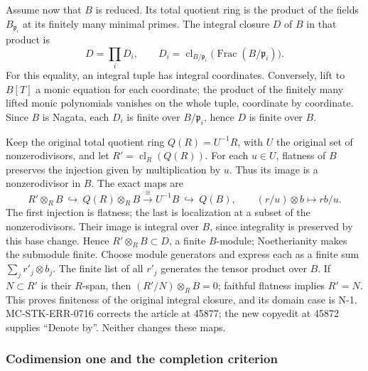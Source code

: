 Assume now that \(B\) is reduced. Its total quotient ring is the product of the fields \(B_{\mathfrak p_i}\) at its finitely many minimal primes. The integral closure \(D\) of \(B\) in that product is \[
 D=\prod_i D_i,\qquad
 D_i=\operatorname{cl}_{B/\mathfrak p_i}\bigl(\operatorname{Frac}(B/\mathfrak p_i)\bigr).
\] For this equality, an integral tuple has integral coordinates. Conversely, lift to \(B[T]\) a monic equation for each coordinate; the product of the finitely many lifted monic polynomials vanishes on the whole tuple, coordinate by coordinate. Since \(B\) is Nagata, each \(D_i\) is finite over \(B/\mathfrak p_i\), hence \(D\) is finite over \(B\).

Keep the original total quotient ring \(Q(R)=U^{-1}R\), with \(U\) the original set of nonzerodivisors, and let \(R'=\operatorname{cl}_R(Q(R))\). For each \(u\in U\), flatness of \(B\) preserves the injection given by multiplication by \(u\). Thus its image is a nonzerodivisor in \(B\). The exact maps are \[
 R'\otimes_R B\ \hookrightarrow\ Q(R)\otimes_R B
 \xrightarrow{\ \cong\ }U^{-1}B\ \hookrightarrow\ Q(B),
 \qquad (r/u)\otimes b\longmapsto rb/u.
\] The first injection is flatness; the last is localization at a subset of the nonzerodivisors. Their image is integral over \(B\), since integrality is preserved by this base change. Hence \(R'\otimes_R B\subset D\), a finite \(B\)-module; Noetherianity makes the submodule finite. Choose module generators and express each as a finite sum \(\sum_j r'_j\otimes b_j\). The finite list of all \(r'_j\) generates the tensor product over \(B\). If \(N\subset R'\) is their \(R\)-span, then \((R'/N)\otimes_R B=0\); faithful flatness implies \(R'=N\). This proves finiteness of the original integral closure, and its domain case is N-1. MC-\AlgebraIdentifierBreak{}STK-\AlgebraIdentifierBreak{}ERR-\AlgebraIdentifierBreak{}0716 corrects the article at 45877; the new copyedit at 45872 supplies ``Denote by''. Neither changes these maps.

\subsubsection{Codimension one and the completion criterion}\label{algebra-proof-067-codimension-one-and-the-completion-criterion}

